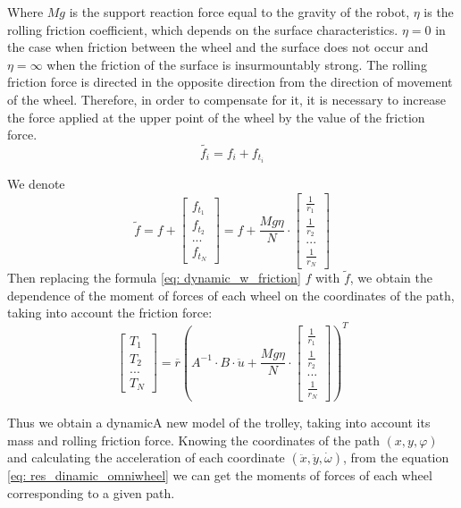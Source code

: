 \documentclass[oneside,final,14pt]{extreport}
\begin{document}
Where $ Mg $ is the support reaction force equal to the gravity of the robot, $ \eta $ is the rolling friction coefficient, which depends on the surface characteristics. $ \eta = 0 $ in the case when friction between the wheel and the surface does not occur and $ \eta = \infty $ when the friction of the surface is insurmountably strong.
The rolling friction force is directed in the opposite direction from the direction of movement of the wheel. Therefore, in order to compensate for it, it is necessary to increase the force applied at the upper point of the wheel by the value of the friction force.
\begin{equation}
\tilde{f_{i}}
=
f_{i}
+
f_{t_{i}}
\end{equation}

We denote
\begin{equation}
\tilde{f}
=
f
+
\begin{bmatrix}
f_{t_{1}} \\
f_{t_{2}} \\
... \\
f_{t_{N}}
\end{bmatrix}
=
f
+
\frac{Mg \eta}{N}
\cdot
\begin{bmatrix}
\frac{1}{r_{1}} \\
\frac{1}{r_{2}} \\
... \\
\frac{1}{r_{N}}
\end{bmatrix}
\end{equation}
Then replacing the formula \ref{eq: dynamic_w_friction} $ f $ with $ \tilde{f} $, we obtain the dependence of the moment of forces of each wheel on the coordinates of the path, taking into account the friction force:
\begin{equation}
\label{eq: res_dinamic_omniwheel}
\begin{bmatrix}
T_{1} \\
T_{2} \\
... \\
T_{N}
\end{bmatrix}
=
\overline{r}
(
A ^{- 1}
\cdot
B
\cdot
\ddot{u}
+
\frac{Mg \eta}{N}
\cdot
\begin{bmatrix}
\frac{1}{r_{1}} \\
\frac{1}{r_{2}} \\
... \\
\frac{1}{r_{N}}
\end{bmatrix}
) ^{T}
\end{equation}

Thus we obtain a dynamicA new model of the trolley, taking into account its mass and rolling friction force. Knowing the coordinates of the path $ (x, y, \varphi) $ and calculating the acceleration of each coordinate $ (\ddot{x}, \ddot{y}, \dot{\omega}) $, from the equation \ref{eq: res_dinamic_omniwheel} we can get the moments of forces of each wheel corresponding to a given path.
\end{document}
